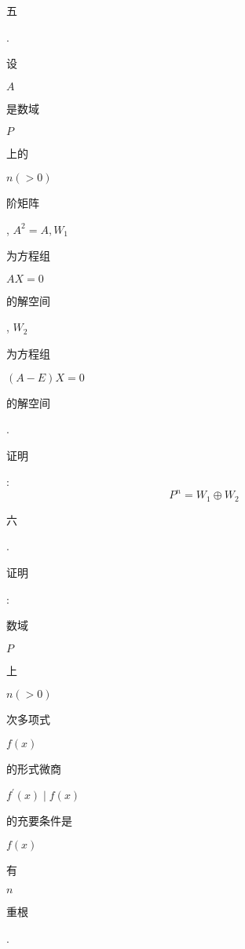 \documentclass[10pt]{article}
\begin{document}
\begin{CJK}{UTF8}{mj}五\end{CJK}. \begin{CJK}{UTF8}{mj}设\end{CJK} $A$ \begin{CJK}{UTF8}{mj}是数域\end{CJK} $P$ \begin{CJK}{UTF8}{mj}上的\end{CJK} $n(>0)$ \begin{CJK}{UTF8}{mj}阶矩阵\end{CJK}, $A^{2}=A, W_{1}$ \begin{CJK}{UTF8}{mj}为方程组\end{CJK} $A X=0$ \begin{CJK}{UTF8}{mj}的解空间\end{CJK}, $W_{2}$ \begin{CJK}{UTF8}{mj}为方程组\end{CJK} $(A-E) X=0$ \begin{CJK}{UTF8}{mj}的解空间\end{CJK}. \begin{CJK}{UTF8}{mj}证明\end{CJK}:
$$
P^{n}=W_{1} \oplus W_{2}
$$
\begin{CJK}{UTF8}{mj}六\end{CJK}. \begin{CJK}{UTF8}{mj}证明\end{CJK}: \begin{CJK}{UTF8}{mj}数域\end{CJK} $P$ \begin{CJK}{UTF8}{mj}上\end{CJK} $n(>0)$ \begin{CJK}{UTF8}{mj}次多项式\end{CJK} $f(x)$ \begin{CJK}{UTF8}{mj}的形式微商\end{CJK} $f^{\prime}(x) \mid f(x)$ \begin{CJK}{UTF8}{mj}的充要条件是\end{CJK} $f(x)$ \begin{CJK}{UTF8}{mj}有\end{CJK} $n$ \begin{CJK}{UTF8}{mj}重根\end{CJK}.
\end{document}
